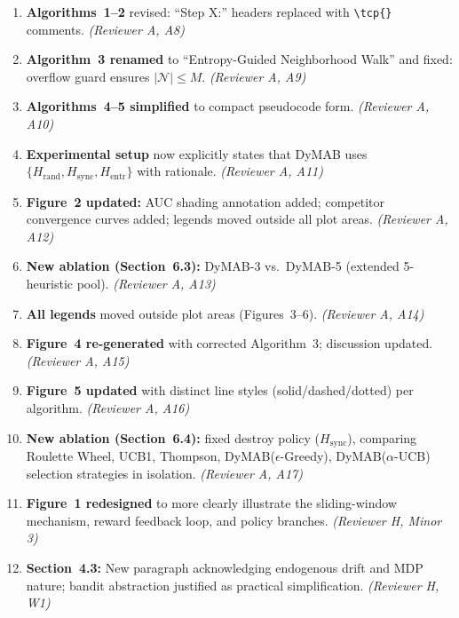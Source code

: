 \documentclass[review]{jair}
\begin{document}
\begin{enumerate}[leftmargin=2em, label=\textbf{C\arabic*}]
  \item \textbf{Algorithms~1--2} revised: ``Step X:'' headers replaced with \texttt{\textbackslash tcp\{\}} comments. \emph{(Reviewer A, A8)}

  \item \textbf{Algorithm~3 renamed} to ``Entropy-Guided Neighborhood Walk'' and fixed: overflow guard ensures $|\mathcal{N}| \leq M$. \emph{(Reviewer A, A9)}

  \item \textbf{Algorithms~4--5 simplified} to compact pseudocode form. \emph{(Reviewer A, A10)}

  \item \textbf{Experimental setup} now explicitly states that DyMAB uses $\{H_{\text{rand}}, H_{\text{sync}}, H_{\text{entr}}\}$ with rationale. \emph{(Reviewer A, A11)}

  \item \textbf{Figure~2 updated:} AUC shading annotation added; competitor convergence curves added; legends moved outside all plot areas. \emph{(Reviewer A, A12)}

  \item \textbf{New ablation (Section~6.3):} DyMAB-3 vs.\ DyMAB-5 (extended 5-heuristic pool). \emph{(Reviewer A, A13)}

  \item \textbf{All legends} moved outside plot areas (Figures~3--6). \emph{(Reviewer A, A14)}

  \item \textbf{Figure~4 re-generated} with corrected Algorithm~3; discussion updated. \emph{(Reviewer A, A15)}

  \item \textbf{Figure~5 updated} with distinct line styles (solid/dashed/dotted) per algorithm. \emph{(Reviewer A, A16)}

  \item \textbf{New ablation (Section~6.4):} fixed destroy policy ($H_{\text{sync}}$), comparing Roulette Wheel, UCB1, Thompson, DyMAB($\epsilon$-Greedy), DyMAB($\alpha$-UCB) selection strategies in isolation. \emph{(Reviewer A, A17)}

  \item \textbf{Figure~1 redesigned} to more clearly illustrate the sliding-window mechanism, reward feedback loop, and policy branches. \emph{(Reviewer H, Minor 3)}

  \item \textbf{Section~4.3:} New paragraph acknowledging endogenous drift and MDP nature; bandit abstraction justified as practical simplification. \emph{(Reviewer H, W1)}


\end{enumerate}
\end{document}

